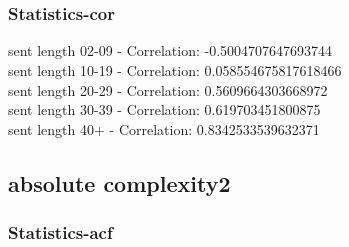 \documentclass{article}%
\begin{document}
\begin{figure}[ht]%
\centering%
\setlength{\abovecaptionskip}{-35pt}%
%
%
\\%
%
%
\\%
%
\end{figure}

%
\newpage%
\subsubsection{Statistics{-}cor}%
\label{ssubsec:Statistics{-}cor}%
\noindent%
sent length 02-09 - Correlation: -0.5004707647693744\\%
sent length 10-19 - Correlation: 0.058554675817618466\\%
sent length 20-29 - Correlation: 0.5609664303668972\\%
sent length 30-39 - Correlation: 0.619703451800875\\%
sent length 40+ - Correlation: 0.8342533539632371\\

%
\newpage

%
\subsection{absolute complexity2}%
\label{subsec:absolutecomplexity2}%
\subsubsection{Statistics{-}acf}%
\label{ssubsec:Statistics{-}acf}%
\end{document}
